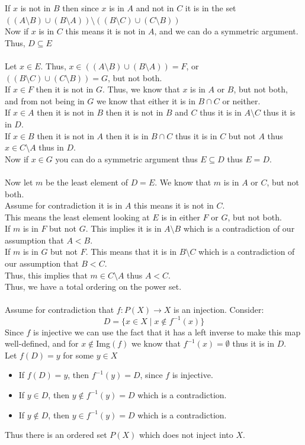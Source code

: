 \documentclass[12pt, letterpaper]{article}
\theoremstyle{definition}
\begin{document}
\begin{enumerate}[(a)]
    If $x$ is not in $B$ then since $x$ is in $A$ and not in $C$ it is in the set $((A \setminus B) \cup (B \setminus A)) \setminus ((B \setminus C) \cup (C \setminus B))$\\
    Now if $x$ is in $C$ this means it is not in $A$, and we can do a symmetric argument. Thus, $D \subseteq E$\\
    \phantom{text}\\
    Let $x \in E$. Thus, $x \in ((A \setminus B) \cup (B \setminus A))=F$, or $((B \setminus C) \cup (C \setminus B))=G$, but not both.\\
    If $x \in F$ then it is not in $G$. Thus, we know that $x$ is in $A$ or $B$, but not both, and from not being in $G$ we know that either it is in $B \cap C$ or neither.\\
    If $x \in A$ then it is not in $B$ then it is not in $B$ and $C$ thus it is in $A \setminus C$ thus it is in $D$.\\
    If $x \in B$ then it is not in $A$ then it is in $B \cap C$ thus it is in $C$ but not $A$ thus $x \in C \setminus A$ thus in $D$.\\
    Now if $x \in G$ you can do a symmetric argument thus $E \subseteq D$ thus $E=D$.\\
    \phantom{text}\\
    Now let $m$ be the least element of $D=E$. We know that $m$ is in $A$ or $C$, but not both.\\
    Assume for contradiction it is in $A$ this means it is not in $C$.\\
    This means the least element looking at $E$ is in either $F$ or $G$, but not both.\\
    If $m$ is in $F$ but not $G$. This implies it is in $A \setminus B$ which is a contradiction of our assumption that $A < B$.\\
    If $m$ is in $G$ but not $F$. This means that it is in $B \setminus C$ which is a contradiction of our assumption that $B < C$.\\
    Thus, this implies that $m \in C \setminus A$ thus $A < C$.\\
    Thus, we have a total ordering on the power set.\\
    \phantom{text}\\
    Assume for contradiction that $f: P(X) \to X$ is an injection. Consider:
    \[D=\{x \in X \mid x \notin f^{-1}(x)\}\]
    Since $f$ is injective we can use the fact that it has a left inverse to make this map well-defined, and for $x \notin $Img$(f)$ we know that $f^{-1}(x) = \emptyset$ thus it is in $D$.\\
    Let $f(D)=y$ for some $y \in X$
    \begin{itemize}
        \item If $f(D)=y$, then $f^{-1}(y)=D$, since $f$ is injective.
        \item If $y \in D$, then $y \notin f^{-1}(y)=D$ which is a contradiction.
        \item If $y \notin D$, then $y \in f^{-1}(y)=D$ which is a contradiction.
    \end{itemize}
    Thus there is an ordered set $P(X)$ which does not inject into $X$.
\end{enumerate}
\end{document}
